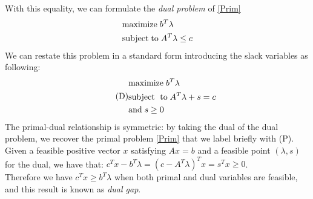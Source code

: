 \documentclass[a4paper,10 pt,titlepage,twoside]{book}
\theoremstyle{plain}
\theoremstyle{definition}
\theoremstyle{remark}
\begin{document}
With this equality, we can formulate the \textit{dual problem} of \ref{Prim}
\begin{equation}\label{Dual}
\begin{split}
&\text{maximize\;} b^{T}\lambda\\
&\text{subject\;to\;}A^{T}\lambda \leq c
\end{split}
\end{equation} 
We can restate this problem in a standard form introducing the slack variables as following:
\begin{equation}\tag{D}
\begin{split}
&\text{maximize\;}b^{T}\lambda\\
&\text{subject\; to\;}A^{T}\lambda+s=c\\ &\text{and\;} s\geq0
\end{split}
\end{equation}
The primal-dual relationship is symmetric: by taking the dual of the dual problem, we recover the primal problem \ref{Prim} that we label briefly with (P).\\
Given a feasible positive vector $x$ satisfying $Ax=b$ and a feasible point $\left(\lambda,s\right)$ for the dual, we have that: $c^{T}x-b^{T}\lambda=\left(c-A^{T}\lambda\right)^{T}x=s^{T}x \geq0$.\\
Therefore we have $c^{T}x\geq b^{T}\lambda$ when both primal and dual variables are feasible, and this result is known as \textit{dual gap}.\\
\end{document}
